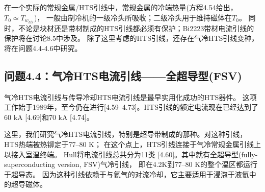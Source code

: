 在一个实际的常规金属/HTS引线中，常规金属的冷端热量(方程4.54给出，$T_0\simeq T_{w_{hts}}$)，
一般由制冷机的一级冷头所吸收；二级冷头用于维持磁体在$T_0$。
同时，不论是块材还是带材制成的HTS引线都必须有保护；Bi2223带材电流引线的保护将在讨论8.5中涉及。
除了这里考虑的HTS引线，还存在气冷HTS引线变种，将在问题4.4-4.6中研究。


\subsection{问题4.4：气冷HTS电流引线——全超导型(FSV)}

气冷HTS电流引线与传导冷却HTS电流引线是最早实用化成功的HTS器件。
这项工作始于1989年，至今仍在进行[4.59–4.73]。HTS引线的额定电流现在已经达到了60 kA [4.69]和70 kA [4.74]。

这里，我们研究气冷HTS电流引线，特别是超导带制成的那种。对这种引线，HTS热端被热铆定于77–80 K；
在这个点上，HTS引线连接于气冷常规金属引线上以接入室温终端。
Hull将电流引线总共分为11类 [4.60]。其中就有全超导型(fully-superconducting version, FSV)气冷引线，
即在4.2K到77–80 K的整个温区都运行于超导态。
因为这种引线依赖于与氦气的对流冷却，它主要适用于浸泡于液氦中的超导磁体。

